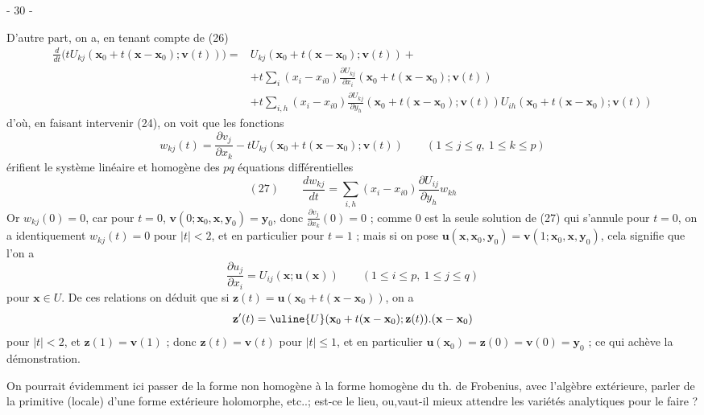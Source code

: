 
\begin{center}- 30 -\end{center}

D'autre part, on a, en tenant compte de (26)
\[
\begin{aligned}
\frac d{dt}\bigl(tU_{kj}(\mathbf{x}_0+t(\mathbf{x}-\mathbf{x}_0);\mathbf{v}(t))\bigr)
={}&U_{kj}(\mathbf{x}_0+t(\mathbf{x}-\mathbf{x}_0);\mathbf{v}(t))+\\
&+t\sum_i(x_i-x_{i0})\frac{\partial U_{kj}}{\partial x_i}
(\mathbf{x}_0+t(\mathbf{x}-\mathbf{x}_0);\mathbf{v}(t))\\
&+t\sum_{i,h}(x_i-x_{i0})\frac{\partial U_{kj}}{\partial y_h}
(\mathbf{x}_0+t(\mathbf{x}-\mathbf{x}_0);\mathbf{v}(t))U_{ih}(\mathbf{x}_0+t(\mathbf{x}-\mathbf{x}_0);\mathbf{v}(t))
\end{aligned}
\]
d'où, en faisant intervenir (24), on voit que les fonctions
\[
w_{kj}(t)=\frac{\partial v_j}{\partial x_k}
-tU_{kj}(\mathbf{x}_0+t(\mathbf{x}-\mathbf{x}_0);\mathbf{v}(t))
\qquad(1\leq j\leq q,\ 1\leq k\leq p)
\]
érifient le système linéaire et homogène des $pq$ équations différentielles
\[
(27)\qquad
\frac{dw_{kj}}{dt}=\sum_{i,h}(x_i-x_{i0})\frac{\partial U_{ij}}{\partial y_h}w_{kh}
\]
Or $w_{kj}(0)=0$, car pour $t=0$, $\mathbf{v}(0;\mathbf{x}_0,\mathbf{x},\mathbf{y}_0)=\mathbf{y}_0$, donc $\frac{\partial v_j}{\partial x_k}(0)=0$ ;
comme $0$ est la seule solution de (27) qui s'annule pour $t=0$, on a identiquement $w_{kj}(t)=0$ pour $|t|<2$, et en particulier pour $t=1$ ;
mais si on pose $\mathbf{u}(\mathbf{x},\mathbf{x}_0,\mathbf{y}_0)=\mathbf{v}(1;\mathbf{x}_0,\mathbf{x},\mathbf{y}_0)$, cela signifie que l'on a
\[
\frac{\partial u_j}{\partial x_i}=U_{ij}(\mathbf{x};\mathbf{u}(\mathbf{x}))
\qquad(1\leq i\leq p,\ 1\leq j\leq q)
\]
pour $\mathbf{x}\in U$. De ces relations on déduit que si $\mathbf{z}(t)=\mathbf{u}(\mathbf{x}_0+t(\mathbf{x}-\mathbf{x}_0))$, on a
\[
\mathbf{z}'(t)=\uline{U}(\mathbf{x}_0+t(\mathbf{x}-\mathbf{x}_0);\mathbf{z}(t)).(\mathbf{x}-\mathbf{x}_0)
\]
pour $|t|<2$, et $\mathbf{z}(1)=\mathbf{v}(1)$ ; donc $\mathbf{z}(t)=\mathbf{v}(t)$ pour $|t|\leq1$, et en particulier $\mathbf{u}(\mathbf{x}_0)=\mathbf{z}(0)=\mathbf{v}(0)=\mathbf{y}_0$ ; ce qui achève la démonstration.

On pourrait évidemment ici passer de la forme non homogène à la forme homogène du th. de Frobenius, avec l'algèbre extérieure, parler de la primitive (locale) d'une forme extérieure holomorphe, etc..; est-ce le lieu, ou,vaut-il mieux attendre les variétés analytiques pour le faire ?
